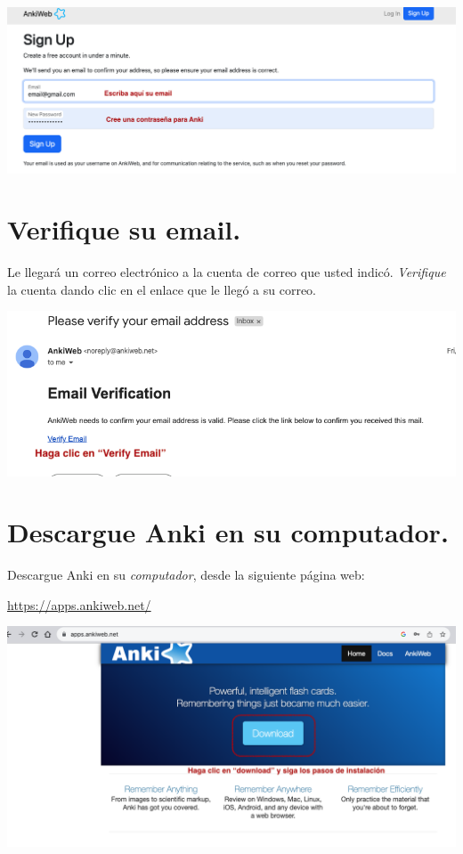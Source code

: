 \documentclass[
]{book}
\begin{document}
\includegraphics[width=0.9\linewidth]{images/reposit_sp/email_password}

\hypertarget{verifique-su-email.}{%
\section{Verifique su email.}\label{verifique-su-email.}}

Le llegará un correo electrónico a la cuenta de correo que usted indicó. \emph{Verifique} la cuenta dando clic en el enlace que le llegó a su correo.

\includegraphics[width=0.9\linewidth]{images/reposit_sp/email_verification}

\hypertarget{descargue-anki-en-su-computador.}{%
\section{Descargue Anki en su computador.}\label{descargue-anki-en-su-computador.}}

Descargue Anki en su \emph{computador}, desde la siguiente página web:

\url{https://apps.ankiweb.net/}

\includegraphics[width=0.6\linewidth]{images/reposit_sp/download}
\end{document}
